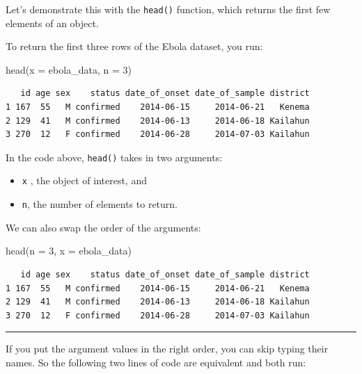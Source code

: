 \documentclass[
  letterpaper,
  DIV=11,
  numbers=noendperiod]{scrreprt}
\newenvironment{Shaded}{\begin{snugshade}}{\end{snugshade}}
\newcommand{\AttributeTok}[1]{\textcolor[rgb]{0.40,0.45,0.13}{#1}}
\newcommand{\DecValTok}[1]{\textcolor[rgb]{0.68,0.00,0.00}{#1}}
\newcommand{\FunctionTok}[1]{\textcolor[rgb]{0.28,0.35,0.67}{#1}}
\newcommand{\NormalTok}[1]{\textcolor[rgb]{0.00,0.23,0.31}{#1}}
\begin{document}
Let's demonstrate this with the \texttt{head()} function, which returns
the first few elements of an object.

To return the first three rows of the Ebola dataset, you run:

\begin{Shaded}
\begin{Highlighting}[]
\FunctionTok{head}\NormalTok{(}\AttributeTok{x =}\NormalTok{ ebola\_data, }\AttributeTok{n =} \DecValTok{3}\NormalTok{)}
\end{Highlighting}
\end{Shaded}

\begin{verbatim}
   id age sex    status date_of_onset date_of_sample district
1 167  55   M confirmed    2014-06-15     2014-06-21   Kenema
2 129  41   M confirmed    2014-06-13     2014-06-18 Kailahun
3 270  12   F confirmed    2014-06-28     2014-07-03 Kailahun
\end{verbatim}

In the code above, \texttt{head()} takes in two arguments:

\begin{itemize}
\item
  \texttt{x} , the object of interest, and
\item
  \texttt{n}, the number of elements to return.
\end{itemize}

We can also swap the order of the arguments:

\begin{Shaded}
\begin{Highlighting}[]
\FunctionTok{head}\NormalTok{(}\AttributeTok{n =} \DecValTok{3}\NormalTok{, }\AttributeTok{x =}\NormalTok{ ebola\_data)}
\end{Highlighting}
\end{Shaded}

\begin{verbatim}
   id age sex    status date_of_onset date_of_sample district
1 167  55   M confirmed    2014-06-15     2014-06-21   Kenema
2 129  41   M confirmed    2014-06-13     2014-06-18 Kailahun
3 270  12   F confirmed    2014-06-28     2014-07-03 Kailahun
\end{verbatim}

\begin{center}\rule{0.5\linewidth}{0.5pt}\end{center}

If you put the argument values in the right order, you can skip typing
their names. So the following two lines of code are equivalent and both
run:
\end{document}
